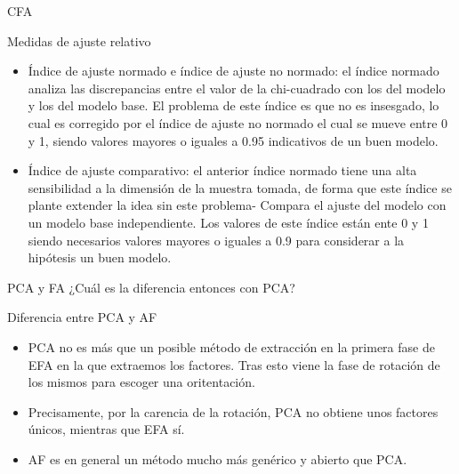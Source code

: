 \documentclass[10pt]{beamer}
\begin{document}
\begin{frame}[fragile]{CFA}
\vspace{10px}
\begin{block}{Medidas de ajuste relativo}
	\begin{itemize}
		\item Índice de ajuste normado e índice de ajuste no normado: el índice normado analiza las discrepancias entre el valor de la chi-cuadrado con los del modelo y los del modelo base. El problema de este índice es que no es insesgado, lo cual es corregido por el índice de ajuste no normado el cual se mueve entre 0 y 1, siendo valores mayores o iguales a 0.95 indicativos de un buen modelo.
		\item Índice de ajuste comparativo: el anterior índice normado tiene una alta sensibilidad a la dimensión de la muestra tomada, de forma que este índice se plante extender la idea sin este problema- Compara el ajuste del modelo con un modelo base independiente. Los valores de este índice están ente 0 y 1 siendo necesarios valores mayores o iguales a 0.9 para considerar a la hipótesis un buen modelo.
	\end{itemize}
\end{block}
\end{frame}

\begin{frame}[fragile]{PCA y FA}
¿Cuál es la diferencia entonces con PCA?
\vspace{10px}
\begin{alertblock}{Diferencia entre PCA y AF}
	\begin{itemize}
		\item PCA no es más que un posible método de extracción en la primera fase de EFA en la que extraemos los factores. Tras esto viene la fase de rotación de los mismos para escoger una oritentación.
		\item Precisamente, por la carencia de la rotación, PCA no obtiene unos factores únicos, mientras que EFA sí. 
		\item AF es en general un método mucho más genérico y abierto que PCA.
	\end{itemize}
\end{alertblock}
\end{frame}

\end{document}
